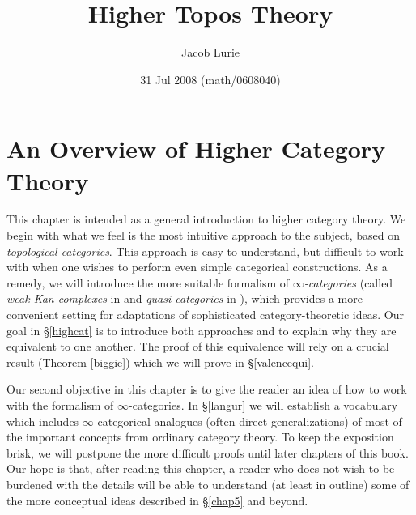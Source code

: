 \documentclass[12pt, final]{report}
\theoremstyle{definition}
\begin{document}
\title{Higher Topos Theory}
\author{Jacob Lurie}
\date{31 Jul 2008 (math/0608040)}




\tableofcontents

\chapter{An Overview of Higher Category Theory}\label{chap1}
\setcounter{theorem}{0}
\setcounter{subsection}{0}
This chapter is intended as a general introduction to higher category theory. We begin with what we feel is the most intuitive approach to the subject, based on {\it topological categories}. This approach is easy to understand, but difficult to work with when one wishes to perform even simple categorical constructions. As a remedy, we will introduce the more suitable formalism of {\it $\infty$-categories} (called
{\it weak Kan complexes} in \cite{quasicat} and {\it quasi-categories} in \cite{joyalpub}), which
provides a more convenient setting for adaptations of sophisticated category-theoretic ideas.
Our goal in \S \ref{highcat} is to introduce both approaches and to explain why they are equivalent to one another. The proof of this equivalence will rely on a crucial result (Theorem \ref{biggie}) which we will prove in \S \ref{valencequi}.

Our second objective in this chapter is to give the reader an idea of how to work with the formalism of $\infty$-categories. In \S \ref{langur} we will establish a vocabulary which includes $\infty$-categorical analogues (often direct generalizations) of most of the important concepts from ordinary category theory. To keep the exposition brisk, we will postpone the more difficult proofs until later chapters of this book. Our hope is that, after reading this chapter, a reader who does not wish to be burdened with the details will be able to understand (at least in outline) some of the more conceptual ideas described in \S \ref{chap5} and beyond.






\end{document}
